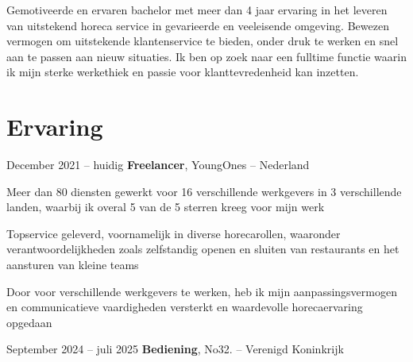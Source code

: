 



	\newcommand{\AND}{\unskip
		\cleaders\copy\ANDbox\hskip\wd\ANDbox
		\ignorespaces
	}
	\newsavebox\ANDbox
	\sbox\ANDbox{$|$}
	
		
	
	\begin{onecolentry}
		Gemotiveerde en ervaren bachelor met meer dan 4 jaar ervaring in het leveren van uitstekend horeca service in gevarieerde en veeleisende omgeving. Bewezen vermogen om uitstekende klantenservice te bieden, onder druk te werken en snel aan te passen aan nieuw situaties. Ik ben op zoek naar een fulltime functie waarin ik mijn sterke werkethiek en passie voor klanttevredenheid kan inzetten.
	\end{onecolentry}
	
	\section{Ervaring}
	
	\begin{twocolentry}{
			December 2021 – huidig
		}
		\textbf{Freelancer}, YoungOnes -- Nederland
	\end{twocolentry}
	
	\vspace{0.10 cm}
	\begin{onecolentry}
		\begin{highlights}
			\item Meer dan 80 diensten gewerkt voor 16 verschillende werkgevers in 3 verschillende landen, waarbij ik overal 5 van de 5 sterren kreeg voor mijn werk
			\item Topservice geleverd, voornamelijk in diverse horecarollen, waaronder verantwoordelijkheden zoals zelfstandig openen en sluiten van restaurants en het aansturen van kleine teams
			\item Door voor verschillende werkgevers te werken, heb ik mijn aanpassingsvermogen en communicatieve vaardigheden versterkt en waardevolle horecaervaring opgedaan
		\end{highlights}
	\end{onecolentry}
	
	\vspace{0.2 cm}
	
	\begin{twocolentry}{
			September 2024 – juli 2025
		}
		\textbf{Bediening}, No32. -- Verenigd Koninkrijk
	\end{twocolentry}
	
